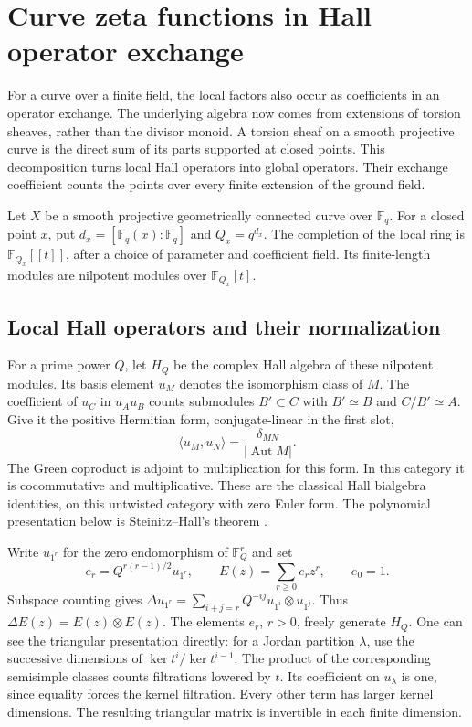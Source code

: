 \section{Curve zeta functions in Hall operator exchange}
\label{intake:curve:section}

For a curve over a finite field, the local factors also occur as
coefficients in an operator exchange. The underlying algebra now comes
from extensions of torsion sheaves, rather than the divisor monoid.
A torsion sheaf on a smooth projective curve is the direct sum of its
parts supported at closed points. This decomposition turns local Hall
operators into global operators. Their exchange coefficient counts the
points over every finite extension of the ground field.

Let $X$ be a smooth projective geometrically connected curve over
$\mathbb F_q$. For a closed point $x$, put $d_x=[\mathbb F_q(x):\mathbb F_q]$
and $Q_x=q^{d_x}$. The completion of the local ring is
$\mathbb F_{Q_x}[[t]]$, after a choice of parameter and coefficient field.
Its finite-length modules are nilpotent modules over $\mathbb F_{Q_x}[t]$.

\subsection{Local Hall operators and their normalization}

For a prime power $Q$, let $H_Q$ be the complex Hall algebra of these
nilpotent modules. Its basis element $u_M$ denotes the isomorphism class
of $M$. The coefficient of $u_C$ in $u_Au_B$ counts submodules
$B'\subset C$ with $B'\simeq B$ and $C/B'\simeq A$.
Give it the positive Hermitian form, conjugate-linear in the first slot,
\[
 \langle u_M,u_N\rangle=\frac{\delta_{MN}}{|\operatorname{Aut}M|}.
\]
The Green coproduct is adjoint to multiplication for this form.
In this category it is cocommutative and multiplicative.
These are the classical Hall bialgebra identities, on this untwisted
category with zero Euler form. The polynomial presentation below is
Steinitz--Hall's theorem
\cite[Theorem~2.6 and equation~(2.9)]{SchiffmannHall}.

Write $u_{1^r}$ for the zero endomorphism of $\mathbb F_Q^r$ and set
\[
 e_r=Q^{r(r-1)/2}u_{1^r},\qquad
 E(z)=\sum_{r\ge0}e_rz^r,\qquad e_0=1.
\]
Subspace counting gives
$\Delta u_{1^r}=\sum_{i+j=r}Q^{-ij}u_{1^i}\otimes u_{1^j}$.
Thus $\Delta E(z)=E(z)\otimes E(z)$. The elements $e_r$, $r>0$,
freely generate $H_Q$. One can see the triangular presentation directly:
for a Jordan partition $\lambda$, use the successive dimensions of
$\ker t^i/\ker t^{i-1}$. The product of the corresponding semisimple
classes counts filtrations lowered by $t$. Its coefficient on $u_\lambda$
is one, since equality forces the kernel filtration. Every other term
has larger kernel dimensions. The resulting triangular matrix is
invertible in each finite dimension.

